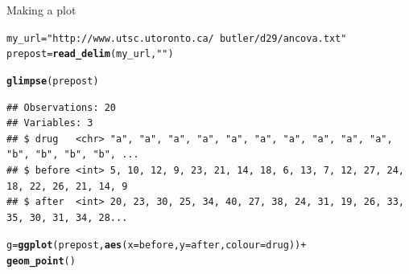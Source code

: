 \documentclass[unknownkeysallowed]{beamer}\usepackage[]{graphicx}\usepackage[]{color}
\makeatletter
\newcommand{\hlstr}[1]{\textcolor[rgb]{0.192,0.494,0.8}{#1}}%
\newcommand{\hlopt}[1]{\textcolor[rgb]{0,0,0}{#1}}%
\newcommand{\hlstd}[1]{\textcolor[rgb]{0.345,0.345,0.345}{#1}}%
\newcommand{\hlkwb}[1]{\textcolor[rgb]{0.69,0.353,0.396}{#1}}%
\newcommand{\hlkwc}[1]{\textcolor[rgb]{0.333,0.667,0.333}{#1}}%
\newcommand{\hlkwd}[1]{\textcolor[rgb]{0.737,0.353,0.396}{\textbf{#1}}}%
\newenvironment{kframe}{%
 \def\at@end@of@kframe{}%
 \ifinner\ifhmode%
  \def\at@end@of@kframe{\end{minipage}}%
  \begin{minipage}{\columnwidth}%
 \fi\fi%
 \def\FrameCommand##1{\hskip\@totalleftmargin \hskip-\fboxsep
 \colorbox{shadecolor}{##1}\hskip-\fboxsep
     \hskip-\linewidth \hskip-\@totalleftmargin \hskip\columnwidth}%
 \MakeFramed {\advance\hsize-\width
   \@totalleftmargin\z@ \linewidth\hsize
   \@setminipage}}%
 {\par\unskip\endMakeFramed%
 \at@end@of@kframe}
\newenvironment{knitrout}{}{} %
\makeatother
\begin{document}
\begin{frame}[fragile]{Making a plot}

 
\begin{knitrout}\small
{}\color{fgcolor}\begin{kframe}
\begin{alltt}
\hlstd{my_url}\hlkwb{=}\hlstr{"http://www.utsc.utoronto.ca/~butler/d29/ancova.txt"}
\hlstd{prepost}\hlkwb{=}\hlkwd{read_delim}\hlstd{(my_url,}\hlstr{" "}\hlstd{)}
\end{alltt}


{\ttfamily\noindent\itshape\color{messagecolor}{\#\# Parsed with column specification:\\\#\# cols(\\\#\#\ \  drug = col\_character(),\\\#\#\ \  before = col\_integer(),\\\#\#\ \  after = col\_integer()\\\#\# )}}\begin{alltt}
\hlkwd{glimpse}\hlstd{(prepost)}
\end{alltt}
\begin{verbatim}
## Observations: 20
## Variables: 3
## $ drug   <chr> "a", "a", "a", "a", "a", "a", "a", "a", "a", "a", "b", "b", "b", "b", ...
## $ before <int> 5, 10, 12, 9, 23, 21, 14, 18, 6, 13, 7, 12, 27, 24, 18, 22, 26, 21, 14, 9
## $ after  <int> 20, 23, 30, 25, 34, 40, 27, 38, 24, 31, 19, 26, 33, 35, 30, 31, 34, 28...
\end{verbatim}
\begin{alltt}
\hlstd{g}\hlkwb{=}\hlkwd{ggplot}\hlstd{(prepost,}\hlkwd{aes}\hlstd{(}\hlkwc{x}\hlstd{=before,}\hlkwc{y}\hlstd{=after,}\hlkwc{colour}\hlstd{=drug))}\hlopt{+}
  \hlkwd{geom_point}\hlstd{()}
\end{alltt}
\end{kframe}
\end{knitrout}
  
  
\end{frame}
\end{document}
